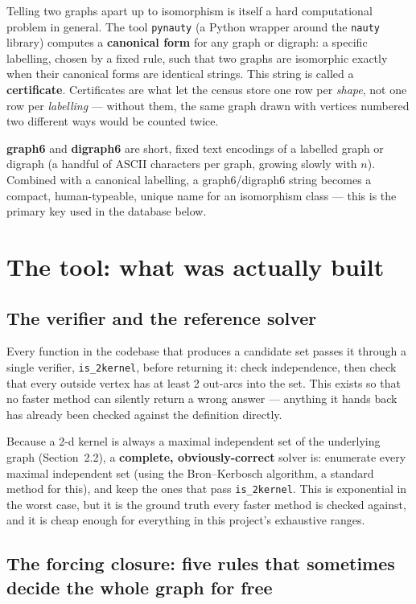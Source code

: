 \documentclass[11pt]{article}
\theoremstyle{plain}
\theoremstyle{definition}
\theoremstyle{remark}
\begin{document}
Telling two graphs apart up to isomorphism is itself a hard computational problem in
general. The tool \texttt{pynauty} (a Python wrapper around the \texttt{nauty}
library) computes a \textbf{canonical form} for any graph or digraph: a specific
labelling, chosen by a fixed rule, such that two graphs are isomorphic exactly when
their canonical forms are identical strings. This string is called a
\textbf{certificate}. Certificates are what let the census store one row per
\emph{shape}, not one row per \emph{labelling} — without them, the same graph drawn
with vertices numbered two different ways would be counted twice.

\textbf{graph6} and \textbf{digraph6} are short, fixed text encodings of a labelled
graph or digraph (a handful of ASCII characters per graph, growing slowly with $n$).
Combined with a canonical labelling, a graph6/digraph6 string becomes a compact,
human-typeable, unique name for an isomorphism class — this is the primary key used
in the database below.

\section{The tool: what was actually built}
\label{sec:tool}

\subsection{The verifier and the reference solver}

Every function in the codebase that produces a candidate set passes it through a
single verifier, \texttt{is\_2kernel}, before returning it: check independence, then
check that every outside vertex has at least 2 out-arcs into the set. This exists so
that no faster method can silently return a wrong answer — anything it hands back has
already been checked against the definition directly.

Because a 2-d kernel is always a maximal independent set of the underlying graph
(Section~2.2), a \textbf{complete, obviously-correct} solver is: enumerate every
maximal independent set (using the Bron--Kerbosch algorithm, a standard method for
this), and keep the ones that pass \texttt{is\_2kernel}. This is exponential in the
worst case, but it is the ground truth every faster method is checked against, and it
is cheap enough for everything in this project's exhaustive ranges.

\subsection{The forcing closure: five rules that sometimes decide the whole graph
for free}
\label{sec:forcing}
\end{document}
